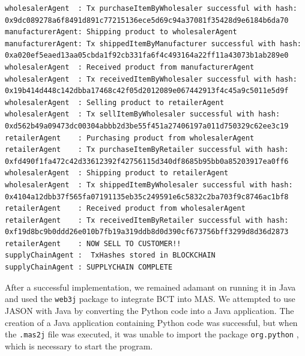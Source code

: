 \begin{lstlisting}[numbers=none, basicstyle=\ttfamily\tiny]
wholesalerAgent  : Tx purchaseItemByWholesaler successful with hash: 0x9dc089278a6f8491d891c77215136ece5d69c94a37081f35428d9e6184b6da70
manufacturerAgent: Shipping product to wholesalerAgent
manufacturerAgent: Tx shippedItemByManufacturer successful with hash: 0xa020ef5eaed13aa05cbda1f92cb331fa6f4c493164a22ff11a43073b1ab289e0
wholesalerAgent  : Received product from manufacturerAgent
wholesalerAgent  : Tx receivedItemByWholesaler successful with hash: 0x19b414d448c142dbba17468c42f05d2012089e067442913f4c45a9c5011e5d9f
wholesalerAgent  : Selling product to retailerAgent
wholesalerAgent  : Tx sellItemByWholesaler successful with hash: 0xd562b49a09473dc00304abbb2d3be55f451a27406197a011d750329c62ee3c19
retailerAgent    : Purchasing product from wholesalerAgent
retailerAgent    : Tx purchaseItemByRetailer successful with hash: 0xfd490f1fa472c42d33612392f42756115d340df8685b95bb0a85203917ea0ff6
wholesalerAgent  : Shipping product to retailerAgent
wholesalerAgent  : Tx shippedItemByWholesaler successful with hash: 0x4104a12dbb37f565fa07191135eb35c249591e6c5832c2ba703f9c8746ac1bf8
retailerAgent    : Received product from wholesalerAgent
retailerAgent    : Tx receivedItemByRetailer successful with hash: 0xf19d8bc9b0ddd26e010b7fb19a319ddb8d0d390cf673756bff3299d8d36d2873
retailerAgent    : NOW SELL TO CUSTOMER!!
supplyChainAgent :  TxHashes stored in BLOCKCHAIN
supplyChainAgent : SUPPLYCHAIN COMPLETE
\end{lstlisting}

\vspace{.5cm}

After a successful implementation, we remained adamant on running it in Java and used the \texttt{web3j} package to integrate \ac{BCT} into \ac{MAS}. We attempted to use JASON with Java by converting the Python code into a Java application. The creation of a Java application containing Python code was successful, but when the \texttt{.mas2j} file was executed, it was unable to import the package \texttt{org.python} , which is necessary to start the program.